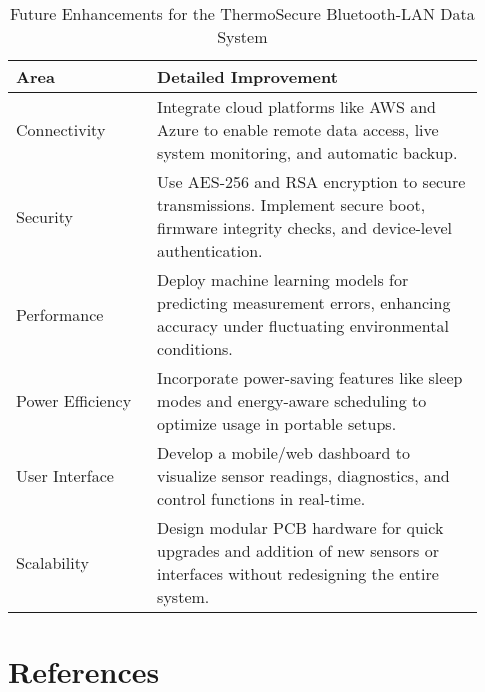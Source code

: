 \documentclass[12pt]{report}
\begin{document}
\begin{table}[H]
\centering
\renewcommand{\arraystretch}{1.4} %
\captionsetup{skip=6pt} %
\begin{tabular}{|p{0.28\linewidth}|p{0.65\linewidth}|}
\hline
\textbf{Area} & \textbf{Detailed Improvement} \\ \hline
Connectivity & Integrate cloud platforms like AWS and Azure to enable remote data access, live system monitoring, and automatic backup. \\ \hline
Security & Use AES-256 and RSA encryption to secure transmissions. Implement secure boot, firmware integrity checks, and device-level authentication. \\ \hline
Performance & Deploy machine learning models for predicting measurement errors, enhancing accuracy under fluctuating environmental conditions. \\ \hline
Power Efficiency & Incorporate power-saving features like sleep modes and energy-aware scheduling to optimize usage in portable setups. \\ \hline
User Interface & Develop a mobile/web dashboard to visualize sensor readings, diagnostics, and control functions in real-time. \\ \hline
Scalability & Design modular PCB hardware for quick upgrades and addition of new sensors or interfaces without redesigning the entire system. \\ \hline
\end{tabular}
\caption{Future Enhancements for the ThermoSecure Bluetooth-LAN Data System}
\label{tab:future}
\end{table}


\chapter*{References}
\end{document}
